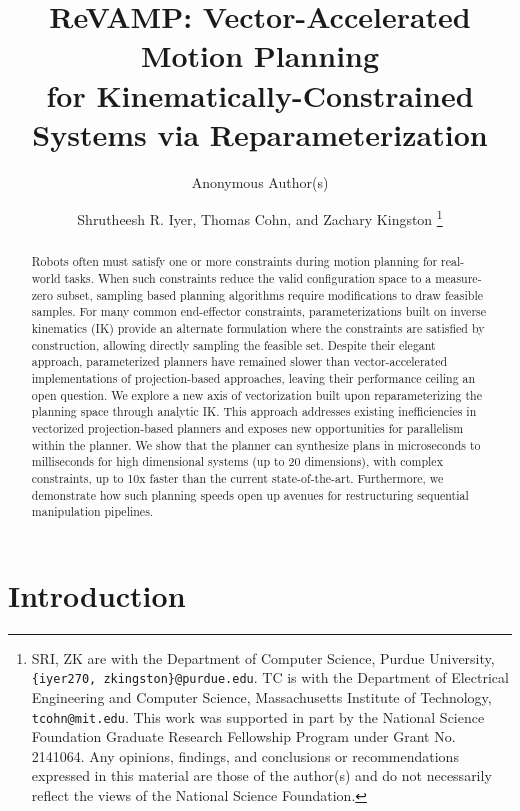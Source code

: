 \documentclass[letterpaper, 10 pt, conference]{ieeeconf}
\title{\LARGE \bf
ReVAMP: Vector-Accelerated Motion Planning \\ for Kinematically-Constrained Systems via Reparameterization
}
\author{Anonymous Author(s)}
\author{
Shrutheesh R. Iyer, Thomas Cohn, and Zachary Kingston%
\thanks{SRI, ZK are with the Department of Computer Science, Purdue University, {\tt \{iyer270,  zkingston\}@purdue.edu}. 
TC is with the Department of Electrical Engineering and Computer Science, Massachusetts Institute of Technology, {\tt tcohn@mit.edu}. This work was supported in part by the National Science Foundation Graduate Research Fellowship Program under Grant No. 2141064. Any opinions, findings, and conclusions or recommendations expressed in this material are those of the author(s) and do not necessarily reflect the views of the National Science Foundation.}%
\\
}
\begin{document}
\maketitle



\begin{abstract}
Robots often must satisfy one or more constraints during motion planning for real-world tasks. When such constraints reduce the valid configuration space to a measure-zero subset, sampling based planning algorithms require modifications to draw feasible samples. For many common end-effector constraints, parameterizations built on inverse kinematics (IK) provide an alternate formulation where the constraints are satisfied by construction, allowing directly sampling the feasible set. Despite their elegant approach, parameterized planners have remained slower than vector-accelerated implementations of projection-based approaches, leaving their performance ceiling an open question. We explore a new axis of vectorization built upon reparameterizing the planning space through analytic IK. This approach addresses existing inefficiencies in vectorized projection-based planners and exposes new opportunities for parallelism within the planner. We show that the planner can synthesize plans in microseconds to milliseconds for high dimensional systems (up to 20 dimensions), with complex constraints, up to 10x faster than the current state-of-the-art. Furthermore, we demonstrate how such planning speeds open up avenues for restructuring sequential manipulation pipelines. 
\end{abstract}

\section{Introduction}

\end{document}

